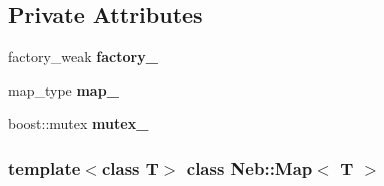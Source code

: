 \subsection*{\-Private \-Attributes}
\begin{DoxyCompactItemize}
\item 
\hypertarget{classNeb_1_1Map_a7291ffc371a2419502e1765c8a78c14f}{factory\-\_\-weak {\bfseries factory\-\_\-}}\label{classNeb_1_1Map_a7291ffc371a2419502e1765c8a78c14f}

\item 
\hypertarget{classNeb_1_1Map_a90e63f3ea00d82d366192f092cdb5fa9}{map\-\_\-type {\bfseries map\-\_\-}}\label{classNeb_1_1Map_a90e63f3ea00d82d366192f092cdb5fa9}

\item 
\hypertarget{classNeb_1_1Map_a4a5af1dd192f030c5522e557246a2a4e}{boost\-::mutex {\bfseries mutex\-\_\-}}\label{classNeb_1_1Map_a4a5af1dd192f030c5522e557246a2a4e}

\end{DoxyCompactItemize}
\subsubsection*{template$<$class \-T$>$ class Neb\-::\-Map$<$ T $>$}



